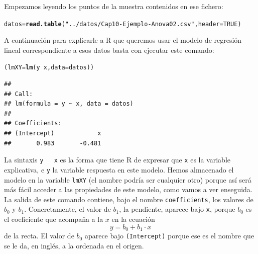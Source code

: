 \documentclass[10pt,a4paper]{article}\usepackage[]{graphicx}\usepackage[]{color}
\makeatletter
\newcommand{\hlnum}[1]{\textcolor[rgb]{0.686,0.059,0.569}{#1}}%
\newcommand{\hlstr}[1]{\textcolor[rgb]{0.192,0.494,0.8}{#1}}%
\newcommand{\hlopt}[1]{\textcolor[rgb]{0,0,0}{#1}}%
\newcommand{\hlstd}[1]{\textcolor[rgb]{0.345,0.345,0.345}{#1}}%
\newcommand{\hlkwb}[1]{\textcolor[rgb]{0.69,0.353,0.396}{#1}}%
\newcommand{\hlkwc}[1]{\textcolor[rgb]{0.333,0.667,0.333}{#1}}%
\newcommand{\hlkwd}[1]{\textcolor[rgb]{0.737,0.353,0.396}{\textbf{#1}}}%
\newenvironment{kframe}{%
 \def\at@end@of@kframe{}%
 \ifinner\ifhmode%
  \def\at@end@of@kframe{\end{minipage}}%
  \begin{minipage}{\columnwidth}%
 \fi\fi%
 \def\FrameCommand##1{\hskip\@totalleftmargin \hskip-\fboxsep
 \colorbox{shadecolor}{##1}\hskip-\fboxsep
     \hskip-\linewidth \hskip-\@totalleftmargin \hskip\columnwidth}%
 \MakeFramed {\advance\hsize-\width
   \@totalleftmargin\z@ \linewidth\hsize
   \@setminipage}}%
 {\par\unskip\endMakeFramed%
 \at@end@of@kframe}
\newenvironment{knitrout}{}{} %
\newcounter {cont01}
\makeatother
\begin{document}
Empezamos leyendo los puntos de la muestra contenidos en ese fichero:
\begin{knitrout}
\color{fgcolor}\begin{kframe}
\begin{alltt}
\hlstd{datos} \hlkwb{=} \hlkwd{read.table}\hlstd{(}\hlstr{"../datos/Cap10-Ejemplo-Anova02.csv"}\hlstd{,} \hlkwc{header}\hlstd{=}\hlnum{TRUE}\hlstd{)}
\end{alltt}
\end{kframe}
\end{knitrout}
A continuación para explicarle a R que queremos usar el modelo de regresión lineal correspondiente a esos datos basta con ejecutar este comando:
\begin{knitrout}
\color{fgcolor}\begin{kframe}
\begin{alltt}
\hlstd{(lmXY} \hlkwb{=} \hlkwd{lm}\hlstd{(y} \hlopt{~} \hlstd{x,} \hlkwc{data}\hlstd{=datos))}
\end{alltt}
\begin{verbatim}
## 
## Call:
## lm(formula = y ~ x, data = datos)
## 
## Coefficients:
## (Intercept)            x  
##       0.983       -0.481
\end{verbatim}
\end{kframe}
\end{knitrout}
La sintaxis {\tt y ~ x} es la forma que tiene R de expresar que {\tt x} es la variable explicativa, e {\tt y} la variable respuesta en este modelo. Hemos almacenado el modelo en la variable {\tt lmXY} (el nombre podría ser cualquier otro) porque así será más fácil acceder a las propiedades de este modelo, como vamos a ver enseguida. La salida de este comando contiene, bajo el nombre {\tt coefficients}, los valores de $b_0$ y $b_1$. Concretamente, el valor de $b_1$, la pendiente, aparece bajo {\tt x}, porque $b_0$ es el coeficiente que acompaña a la $x$ en la ecuación
\[y = b_0 + b_1 \cdot x\]
de la recta. El valor de $b_0$ aparece bajo {\tt (Intercept)} porque ese es el nombre que se le da, en inglés, a la ordenada en el origen.
\end{document}
